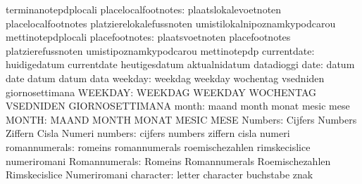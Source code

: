                                   terminanotepdplocali
             placelocalfootnotes: plaatslokalevoetnoten            placelocalfootnotes
                                  platzierelokalefussnoten         umistilokalnipoznamkypodcarou
                                  mettinotepdplocali
                  placefootnotes: plaatsvoetnoten                  placefootnotes
                                  platzierefussnoten               umistipoznamkypodcarou
                                  mettinotepdp
                     currentdate: huidigedatum                     currentdate
                                  heutigesdatum                    aktualnidatum
                                  datadioggi
                            date: datum                            date
                                  datum                            datum
                                  data
                         weekday: weekdag                          weekday
                                  wochentag                        vsedniden
                                  giornosettimana
                         WEEKDAY: WEEKDAG                          WEEKDAY
                                  WOCHENTAG                        VSEDNIDEN
                                  GIORNOSETTIMANA
                           month: maand                            month
                                  monat                            mesic
                                  mese
                           MONTH: MAAND                            MONTH
                                  MONAT                            MESIC
                                  MESE
                         Numbers: Cijfers                          Numbers
                                  Ziffern                          Cisla
                                  Numeri
                         numbers: cijfers                          numbers
                                  ziffern                          cisla
                                  numeri
                   romannumerals: romeins                          romannumerals
                                  roemischezahlen                  rimskecislice
                                  numeriromani
                   Romannumerals: Romeins                          Romannumerals
                                  Roemischezahlen                  Rimskecislice
                                  Numeriromani
                       character: letter                           character
                                  buchstabe                        znak
